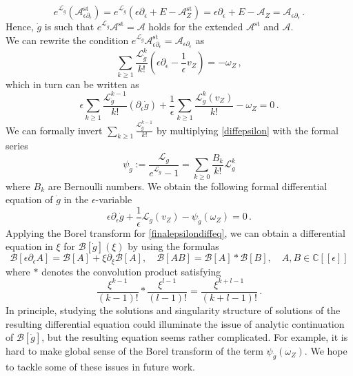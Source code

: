 \documentclass{article}
\theoremstyle{definition}
\numberwithin{equation}{section}
\begin{document}
\begin{equation*}
     e^{\mathcal{L}_{\dot{g}}}(\mathcal{A}^{\text{st}}_{\epsilon \partial_{\epsilon}})= e^{\mathcal{L}_{\dot{g}}}(\epsilon\partial_{\epsilon}+E - \mathcal{A}^{\text{st}}_Z)=\epsilon \partial_{\epsilon}+E - \mathcal{A}_Z=\mathcal{A}_{\epsilon \partial_{\epsilon}}\,.
\end{equation*}
Hence, $\dot{g}$ is such that $e^{\mathcal{L}_{\dot{g}}}\mathcal{A}^{\text{st}}=\mathcal{A}$ holds for the extended $\mathcal{A}^{\text{st}}$ and $\mathcal{A}$.\\

We can rewrite the condition $e^{\mathcal{L}_{\dot{g}}}\mathcal{A}^{\text{st}}_{\epsilon\partial_{\epsilon}}=\mathcal{A}_{\epsilon\partial_{\epsilon}}$ as
\begin{equation*}
    \sum_{k\geq 1}\frac{\mathcal{L}_{\dot{g}}^k}{k!}(\epsilon\partial_{\epsilon}-\frac{1}{\epsilon}v_Z)=-\omega_Z\,,
\end{equation*}
which in turn can be written as 
\begin{equation}\label{diffepsilon}
    \epsilon\sum_{k\geq 1}\frac{\mathcal{L}_{\dot{g}}^{k-1}}{k!}(\partial_{\epsilon}\dot{g})+\frac{1}{\epsilon}\sum_{k\geq 1}\frac{\mathcal{L}_{\dot{g}}^k(v_Z)}{k!}-\omega_Z=0\,.
\end{equation}
We can formally invert $\sum_{k\geq 1}\frac{\mathcal{L}_{\dot{g}}^{k-1}}{k!}$ by multiplying \eqref{diffepsilon} with the formal series
\begin{equation*}
    \psi_{\dot{g}}:=\frac{\mathcal{L}_{\dot{g}}}{e^{\mathcal{L}_{\dot{g}}}-1}=\sum_{k\geq 0}\frac{B_k}{k!}\mathcal{L}_{\dot{g}}^k
\end{equation*}
where $B_k$ are Bernoulli numbers. We obtain the following formal differential equation of $\dot{g}$ in the $\epsilon$-variable
\begin{equation}\label{finalepsilondiffeq}
    \epsilon\partial_{\epsilon}\dot{g}+\frac{1}{\epsilon}\mathcal{L}_{\dot{g}}(v_Z)-\psi_{\dot{g}}(\omega_Z)=0\,.
\end{equation}
Applying the Borel transform for \eqref{finalepsilondiffeq}, we can obtain a differential equation in $\xi$ for $\mathcal{B}[\dot{g}](\xi)$ by using the formulas
\begin{equation*}
    \mathcal{B}[\epsilon \partial_\epsilon A]=\mathcal{B}[A]+\xi \partial_{\xi}\mathcal{B}[A], \quad \mathcal{B}[AB]=\mathcal{B}[A]*\mathcal{B}[B], \quad A,B\in \mathbb{C}[[\epsilon]]
\end{equation*}
where $*$ denotes the convolution product satisfying 
\begin{equation*}
\frac{\xi^{k-1}}{(k-1)!}*\frac{\xi^{l-1}}{(l-1)!}=\frac{\xi^{k+l-1}}{(k+l-1)!}\,.
\end{equation*}
In principle, studying the solutions and singularity structure of solutions of the resulting differential equation could illuminate the issue of analytic continuation of $\mathcal{B}[\dot{g}]$, but the resulting equation seems rather complicated. For example, it is hard to make global sense of the Borel transform of the term $\psi_{\dot{g}}(\omega_Z)$. We hope to tackle some of these issues in future work. 
\end{document}
